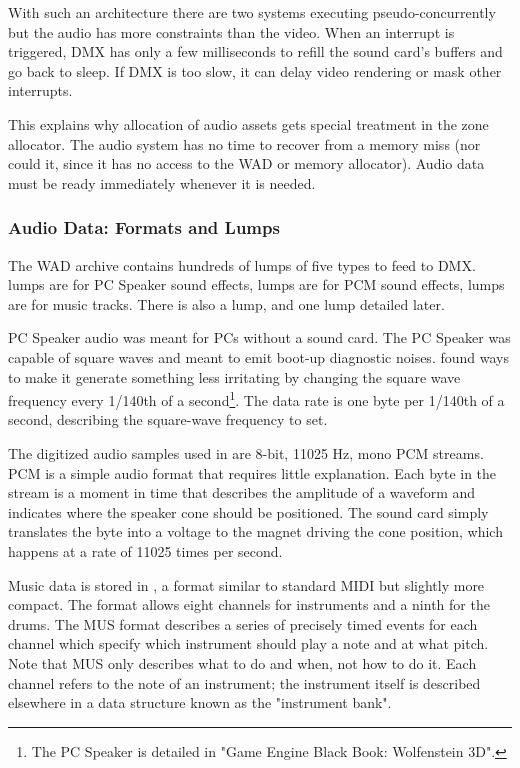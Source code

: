 With such an architecture there are two systems executing pseudo-concurrently but the audio has more constraints than the video. When an interrupt is triggered, DMX has only a few milliseconds to refill the sound card's buffers and go back to sleep. If DMX is too slow, it can delay video rendering or mask other interrupts.\\
\par
 This explains why allocation of audio assets gets special treatment in the zone allocator. The audio system has no time to recover from a memory miss (nor could it, since it has no access to the WAD or memory allocator). Audio data must be ready immediately whenever it is needed.

\subsubsection{Audio Data: Formats and Lumps}
The WAD archive contains hundreds of lumps of five types to feed to DMX.  lumps are for PC Speaker sound effects,  lumps are for PCM sound effects,  lumps are for music tracks. There is also a  lump, and one  lump detailed later.\\
\par
PC Speaker audio was meant for PCs without a sound card. The PC Speaker was capable of square waves and meant to emit boot-up diagnostic noises. \doom{} found ways to make it generate something less irritating by changing the square wave frequency every 1/140th of a second\footnote{The PC Speaker is detailed in "Game Engine Black Book: Wolfenstein 3D".}. The data rate is one byte per 1/140th of a second, describing the square-wave frequency to set.\\
\par
The digitized audio samples used in \doom{} are 8-bit, 11025 Hz, mono PCM streams. PCM is a simple audio format that requires little explanation. Each byte in the stream is a moment in time that describes the amplitude of a waveform and indicates where the speaker cone should be positioned. The sound card simply translates the byte into a voltage to the magnet driving the cone position, which happens at a rate of 11025 times per second.\\
\par
Music data is stored in , a format similar to standard MIDI but slightly more compact. The format allows eight channels for instruments and a ninth for the drums. The MUS format describes a series of precisely timed events for each channel which specify which instrument should play a note and at what pitch. Note that MUS only describes what to do and when, not how to do it. Each channel refers to the note of an instrument; the instrument itself is described elsewhere in a data structure known as the "instrument bank".\\
